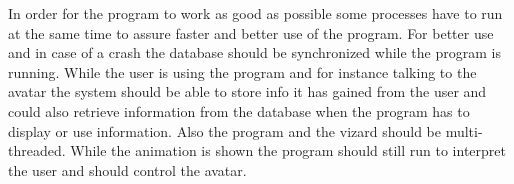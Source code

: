 
In order for the program to work as good as possible some processes have to run at the same time to assure faster and better use of the program. 
For better use and in case of a crash the database should be synchronized while the program is running. While the user is using the program and for instance talking to the avatar the system should be able to store info it has gained from the user and could also retrieve information from the database when the program has to display or use information.
Also the program and the vizard should be multi-threaded. While the animation is shown the program should still run to interpret the user and should control the avatar. 
